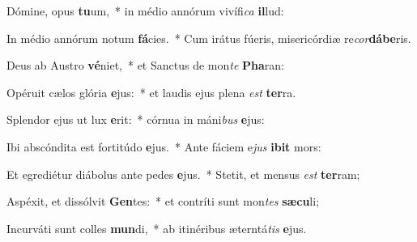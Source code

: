 \item Dómine, opus \textbf{tu}um,~* in médio annórum vivífi\textit{ca} \textbf{il}lud:
\item In médio annórum notum \textbf{fá}cies.~* Cum irátus fúeris, misericórdiæ re\textit{cor}\textbf{dá}\textbf{be}ris.
\item Deus ab Austro \textbf{vé}niet,~* et Sanctus de mon\textit{te} \textbf{Pha}ran:
\item Opéruit cælos glória \textbf{e}jus:~* et laudis ejus plena \textit{est} \textbf{ter}ra.
\item Splendor ejus ut lux \textbf{e}rit:~* córnua in máni\textit{bus} \textbf{e}jus:
\item Ibi abscóndita est fortitúdo \textbf{e}jus.~* Ante fáciem e\textit{jus} \textbf{i}\textbf{bit} mors:
\item Et egrediétur diábolus ante pedes \textbf{e}jus.~* Stetit, et mensus \textit{est} \textbf{ter}ram;
\item Aspéxit, et dissólvit \textbf{Gen}tes:~* et contríti sunt mon\textit{tes} \textbf{sæ}\textbf{cu}li;
\item Incurváti sunt colles \textbf{mun}di,~* ab itinéribus æterntá\textit{tis} \textbf{e}jus.
